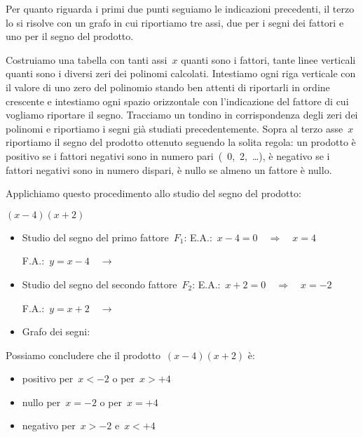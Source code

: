 Per quanto riguarda i primi due punti seguiamo le indicazioni precedenti, 
il terzo lo si risolve con un grafo in cui riportiamo tre assi, due per i 
segni dei fattori e uno per il segno del prodotto.

Costruiamo una tabella con tanti assi~$x$ quanti sono i fattori, tante 
linee verticali quanti sono i diversi zeri dei polinomi calcolati. 
Intestiamo ogni riga verticale con il valore di uno zero del polinomio
stando ben attenti 
di riportarli in ordine crescente e intestiamo ogni spazio orizzontale con 
l'indicazione del fattore di cui vogliamo riportare il segno. 
Tracciamo un tondino in corrispondenza degli zeri dei polinomi e riportiamo 
i segni già studiati precedentemente. 
Sopra al terzo asse~$x$ riportiamo il segno del prodotto ottenuto 
seguendo la solita regola: un prodotto è positivo se i fattori negativi 
sono in numero pari~(~0,~2,~\dots), è negativo se i fattori negativi sono in 
numero dispari, è nullo se almeno un fattore è nullo.

\begin{exrig}
 \begin{esempio}
Applichiamo questo procedimento allo studio del segno del 
prodotto: 

$(x-4)(x+2)$

\begin{itemize}
 \item Studio del segno del primo fattore~$F_1$:
 \subitem E.A.:~$x - 4 = 0 \quad \Rightarrow \quad x = 4$
 \subitem
  \begin{minipage}{.25\textwidth}
  F.A.:~$y = x - 4 \quad \rightarrow$
  \end{minipage}
  \begin{minipage}{.30\textwidth}
  
  \end{minipage}
 \item Studio del segno del secondo fattore~$F_2$:
 \subitem E.A.:~$x + 2 = 0 \quad \Rightarrow \quad x=-2$
 \subitem
  \begin{minipage}{.25\textwidth}
  F.A.:~$y = x + 2 \quad \rightarrow$
  \end{minipage}
  \begin{minipage}{.30\textwidth}
  
  \end{minipage}
 \item Grafo dei segni:
  
\end{itemize}

Possiamo concludere che il prodotto~$(x -4)(x +2)$ è:

\begin{itemize}
 \item positivo per~$x < -2$ o per~$x > +4$
 \item nullo per~$x = -2$ o per~$x = +4$
 \item negativo per~$x > -2$ e~$x < +4$
\end{itemize}
 \end{esempio}
\end{exrig}



